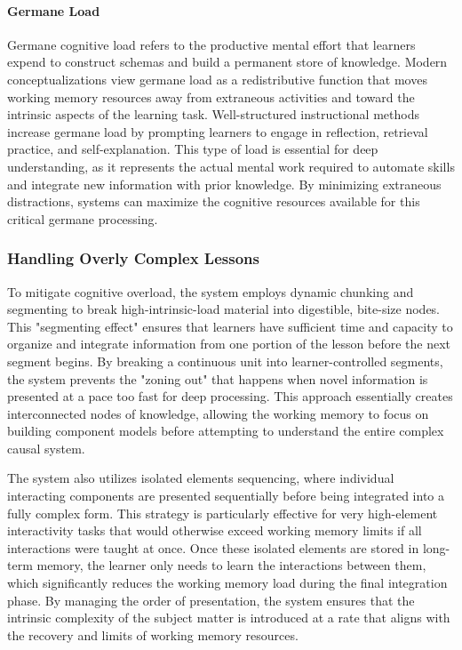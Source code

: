 \paragraph{Germane Load}
Germane cognitive load refers to the productive mental effort that learners expend to construct schemas and build a permanent store of knowledge. Modern conceptualizations view germane load as a redistributive function that moves working memory resources away from extraneous activities and toward the intrinsic aspects of the learning task. Well-structured instructional methods increase germane load by prompting learners to engage in reflection, retrieval practice, and self-explanation. This type of load is essential for deep understanding, as it represents the actual mental work required to automate skills and integrate new information with prior knowledge. By minimizing extraneous distractions, systems can maximize the cognitive resources available for this critical germane processing\cite{best2024Bjorn}.

\subsubsection{Handling Overly Complex Lessons}
To mitigate cognitive overload, the system employs dynamic chunking and segmenting to break high-intrinsic-load material into digestible, bite-size nodes. This "segmenting effect" ensures that learners have sufficient time and capacity to organize and integrate information from one portion of the lesson before the next segment begins. By breaking a continuous unit into learner-controlled segments, the system prevents the "zoning out" that happens when novel information is presented at a pace too fast for deep processing. This approach essentially creates interconnected nodes of knowledge, allowing the working memory to focus on building component models before attempting to understand the entire complex causal system\cite{mayer2003}.

The system also utilizes isolated elements sequencing, where individual interacting components are presented sequentially before being integrated into a fully complex form. This strategy is particularly effective for very high-element interactivity tasks that would otherwise exceed working memory limits if all interactions were taught at once. Once these isolated elements are stored in long-term memory, the learner only needs to learn the interactions between them, which significantly reduces the working memory load during the final integration phase. By managing the order of presentation, the system ensures that the intrinsic complexity of the subject matter is introduced at a rate that aligns with the recovery and limits of working memory resources\cite{Cog2019Sweller}.

